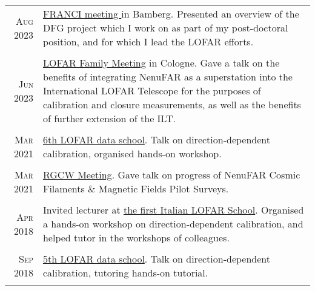 \documentclass[11pt,a4paper,notitlepage]{article}
\begin{document}
\begin{tabular}{r|p{12.5cm}}
	
	
	

	\textsc{Aug 2023} & \href{https://indico.ecap.work/event/27/}{FRANCI meeting }in Bamberg. Presented an overview of the DFG project which I work on as part of my post-doctoral position, and for which I lead the LOFAR efforts.\\
	\multicolumn{2}{c}{} \\
	
	\textsc{Jun 2023} & \href{https://www.glowconsortium.de/index.php/en/lofar-family-meeting-2022}{LOFAR Family Meeting} in Cologne. Gave a talk on the benefits of integrating NenuFAR as a superstation into the International LOFAR Telescope for the purposes of calibration and closure measurements, as well as the benefits of further extension of the ILT.\\
	\multicolumn{2}{c}{} \\
%		
%	
	
	\textsc{Mar 2021} & \href{https://www.astron.nl/lofarschool2021/}{6th LOFAR data school}. Talk on direction-dependent calibration, organised hands-on workshop.\\
	\multicolumn{2}{c}{} \\
	
	\textsc{Mar 2021} & \href{https://sites.google.com/inaf.it/rgcw-meeting/home-page}{RGCW Meeting}. Gave talk on progress of NenuFAR Cosmic Filaments \& Magnetic Fields Pilot Surveys.\\
	\multicolumn{2}{c}{} \\
	
	\textsc{Apr 2018} & Invited lecturer at \href{https://indico.ced.inaf.it/event/9/}{the first Italian LOFAR School}. Organised a hands-on workshop on direction-dependent calibration, and helped tutor in the workshops of colleagues.\\
	\multicolumn{2}{c}{} \\
	
	\textsc{Sep 2018} & \href{https://www.astron.nl/lofarschool2018/}{5th LOFAR data school}. Talk on direction-dependent calibration, tutoring hands-on tutorial.\\
	\multicolumn{2}{c}{} \\
	

\end{tabular}
\end{document}
